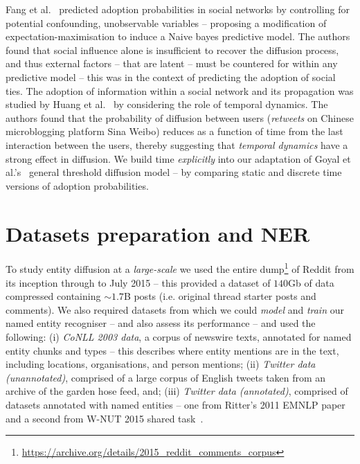 \documentclass[sigconf,anonymous,review]{acmart}
\begin{document}
Fang et al.~\cite{fang2013predicting} predicted adoption probabilities in social networks by controlling for potential confounding, unobservable variables -- proposing a modification of expectation-maximisation to induce a Naive bayes predictive model.
The authors found that social influence alone is insufficient to recover the diffusion process, and thus external factors -- that are latent -- must be countered for within any predictive model -- this was in the context of predicting the adoption of social ties.
The adoption of information within a social network and its propagation was studied by Huang et al.~\cite{huang2014temporal} by considering the role of temporal dynamics.
The authors found that the probability of diffusion between users (\emph{retweets} on Chinese microblogging platform Sina Weibo) reduces as a function of time from the last interaction between the users, thereby suggesting that \emph{temporal dynamics} have a strong effect in diffusion.
We build time \emph{explicitly} into our adaptation of Goyal et al.'s~\cite{goyal2010learning} general threshold diffusion model -- by comparing static and discrete time versions of adoption probabilities.



%


\section{Datasets preparation and NER}
\label{sec:datasets_ner} 
To study entity diffusion at a \emph{large-scale} we used the entire dump\footnote{\url{https://archive.org/details/2015_reddit_comments_corpus}} of Reddit from its inception through to July 2015 -- this provided a dataset of $140$Gb of data compressed containing $\sim1.7$B posts (i.e. original thread starter posts and comments).
We also required datasets from which we could \emph{model} and \emph{train} our named entity recogniser -- and also assess its performance -- and used the following:
(i) \emph{CoNLL 2003 data}, a corpus of newswire texts, annotated for named entity chunks and types -- this describes where entity mentions are in the text, including locations, organisations, and person mentions; 
(ii) \emph{Twitter data (unannotated)}, comprised of a large corpus of English tweets taken from an archive of the garden hose feed, and; 
(iii) \emph{Twitter data (annotated)}, comprised of datasets annotated with named entities -- one from Ritter's 2011 EMNLP paper~\cite{ritter2011named} and a second from W-NUT 2015 shared task~\cite{baldwin2015shared}.
\end{document}
